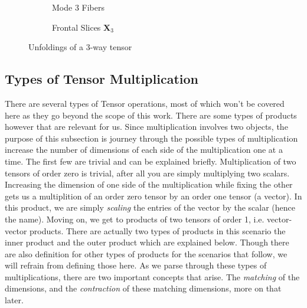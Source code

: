 \begin{figure}[ht!]
        \vspace{1em}

        \begin{subfigure}[b]{0.24\textwidth}
            \centering
            
            \caption[Tube Fibers]{Mode 3 Fibers}
        \end{subfigure}
        \hfill
        \begin{subfigure}[b]{0.74\textwidth}
            \centering
            
            \caption[Tube Fibers]{Frontal Slices $\mathbf{X}_3$}
        \end{subfigure}

        \caption{Unfoldings of a 3-way tensor}
        \label{unfoldings}
    \end{figure}

\subsection{Types of Tensor Multiplication} \label{sec:Types of Tensor Multiplication}
    There are several types of Tensor operations, most of which won't be covered
    here as they go beyond the scope of this work. There are some types of
    products however that are relevant for us. Since multiplication involves two
    objects, the purpose of this subsection is journey through the possible
    types of multiplication increase the number of dimensions of each side of
    the multiplication one at a time. The first few are trivial and can be
    explained briefly. Multiplication of two tensors of order zero is trivial,
    after all you are simply multiplying two scalars. Increasing the dimension
    of one side of the multiplication while fixing the other gets us a
    multiplition of an order zero tensor by an order one tensor (a vector). In
    this product, we are simply \textit{scaling} the entries of the vector by
    the scalar (hence the name). Moving on, we get to products of two tensors of
    order 1, i.e. vector-vector products. There are actually two types of
    products in this scenario the inner product and the outer product which are
    explained below. Though there are also definition for other types of
    products for the scenarios that follow, we will refrain from defining those
    here. As we parse through these types of multiplications, there are two important
    concepts that arise. The \textit{matching} of the dimensions, and the
    \textit{contraction} of these matching dimensions, more on that later.

